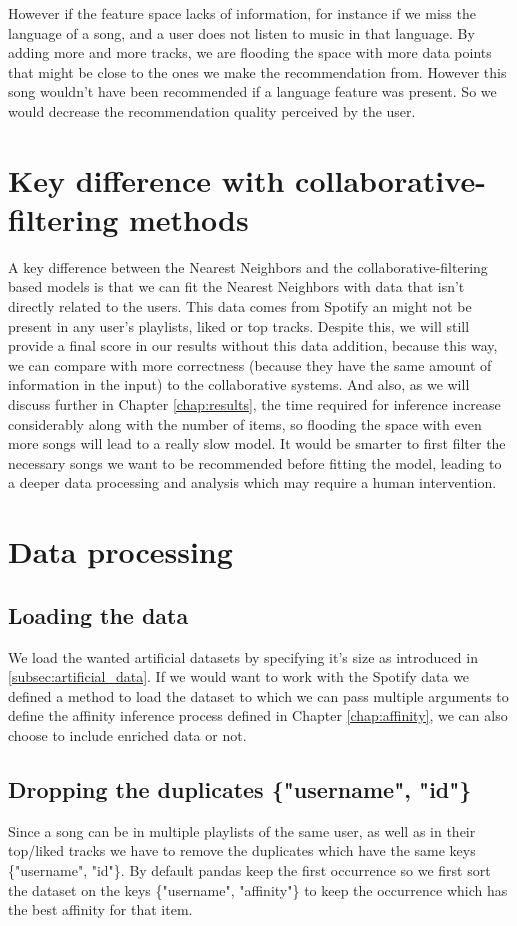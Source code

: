 However if the feature space lacks of information, for instance if we miss the language of a song, and a user does not listen to music in that language. By adding more and more tracks, we are flooding the space with more data points that might be close to the ones we make the recommendation from. However this song wouldn't have been recommended if a language feature was present. So we would decrease the recommendation quality perceived by the user.

\section{Key difference with collaborative-filtering methods}
A key difference between the Nearest Neighbors and the collaborative-filtering based models is that we can fit the Nearest Neighbors with data that isn't directly related to the users. This data comes from Spotify an might not be present in any user's playlists, liked or top tracks. Despite this, we will still provide a final score in our results without this data addition, because this way, we can compare with more correctness (because they have the same amount of information in the input) to the collaborative systems. And also, as we will discuss further in Chapter \ref{chap:results}, the time required for inference increase considerably along with the number of items, so flooding the space with even more songs will lead to a really slow model. It would be smarter to first filter the necessary songs we want to be recommended before fitting the model, leading to a deeper data processing and analysis which may require a human intervention.

\section{Data processing}
\subsection{Loading the data} \label{subsec:nn_loading_data}
We load the wanted artificial datasets by specifying it's size as introduced in \ref{subsec:artificial_data}. If we would want to work with the Spotify data we defined a method to load the dataset to which we can pass multiple arguments to define the affinity inference process defined in Chapter \ref{chap:affinity}, we can also choose to include enriched data or not.

\subsection{Dropping the duplicates \{"username", "id"\}} \label{subsec:nn_dropping_dup_user_id}
Since a song can be in multiple playlists of the same user, as well as in their top/liked tracks we have to remove the duplicates which have the same keys \{"username", "id"\}. By default pandas keep the first occurrence so we first sort the dataset on the keys \{"username", "affinity"\} to keep the occurrence which has the best affinity for that item.

